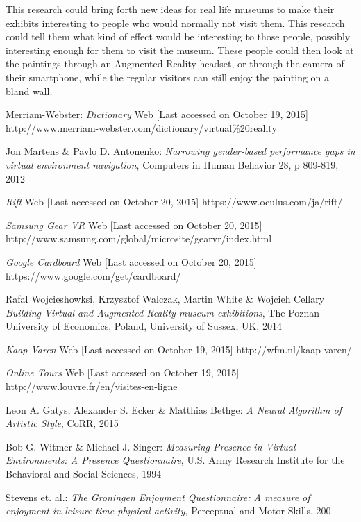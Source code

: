 \documentclass[a4paper]{article}
\begin{document}
This research could bring forth new ideas for real life museums to make their exhibits interesting to people who would normally not visit them. This research could tell them what kind of effect would be interesting to those people, possibly interesting enough for them to visit the museum. These people could then look at the paintings through an Augmented Reality headset, or through the camera of their smartphone, while the regular visitors can still enjoy the painting on a bland wall. 

\begin{thebibliography}{99}

 Merriam-Webster:
\emph{Dictionary}
Web [Last accessed on October 19, 2015]
http://www.merriam-webster.com/dictionary/virtual\%20reality

 Jon Martens \& Pavlo D. Antonenko:
\emph{Narrowing gender-based performance gaps in virtual environment navigation},
Computers in Human Behavior 28, p 809-819, 2012

\emph{Rift}
Web [Last accessed on October 20, 2015]
https://www.oculus.com/ja/rift/

\emph{Samsung Gear VR}
Web [Last accessed on October 20, 2015]
http://www.samsung.com/global/microsite/gearvr/index.html

\emph{Google Cardboard}
Web [Last accessed on October 20, 2015]
https://www.google.com/get/cardboard/

 Rafal Wojcieshowksi, Krzysztof Walczak, Martin White \& Wojcieh Cellary
\emph{Building Virtual and Augmented Reality museum exhibitions},
The Poznan University of Economics, Poland,
University of Sussex, UK, 2014

\emph{Kaap Varen}
Web [Last accessed on October 19, 2015]
http://wfm.nl/kaap-varen/

\emph{Online Tours}
Web [Last accessed on October 19, 2015]
http://www.louvre.fr/en/visites-en-ligne

 Leon A. Gatys, Alexander S. Ecker \& Matthias Bethge:
\emph{A Neural Algorithm of Artistic Style},
CoRR, 2015

 Bob G. Witmer \& Michael J. Singer:
\emph{Measuring Presence in Virtual Environments: A Presence Questionnaire},
U.S. Army Research Institute for the Behavioral and Social Sciences, 1994

 Stevens et. al.:
\emph{The Groningen Enjoyment Questionnaire: A measure of enjoyment in leisure-time physical activity},
Perceptual and Motor Skills, 200


\end{thebibliography}
\end{document}
